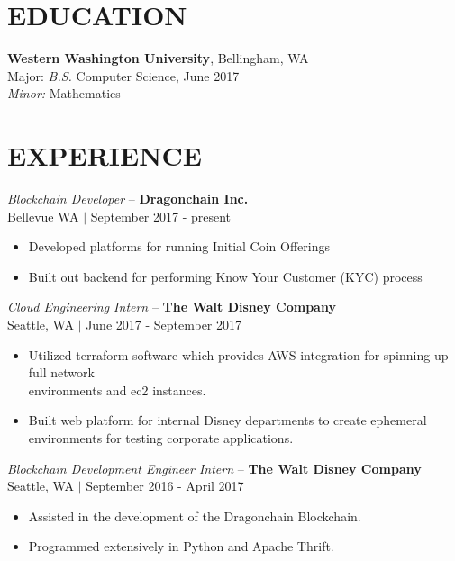 \documentclass[line,margin]{res}
\begin{document}
\address{alex@alex-benedetto.com $|$ github.com/wolfpack94}

\begin{resume}

\section{EDUCATION}
	{\bf Western Washington University}, Bellingham, WA \\
	Major: {\sl B.S.} Computer Science, {\small June 2017}\\
	{\sl Minor:} Mathematics
\section{EXPERIENCE}
	{\sl Blockchain Developer} -- {\bf Dragonchain Inc.}\\
	\footnotesize Bellevue WA $|$ September 2017 - present\\
	\begin{itemize} \itemsep -2pt
		\item Developed platforms for running Initial Coin Offerings\\
		\item Built out backend for performing Know Your Customer (KYC) process\\
	\end{itemize}
	{\sl Cloud Engineering Intern} -- {\bf The Walt Disney Company}\\ 
	{\footnotesize Seattle, WA $|$ June 2017 - September 2017}\\
	\begin{itemize} \itemsep -2pt
		\item Utilized terraform software which provides AWS integration for spinning up full network \\environments and ec2 instances.
		\item Built web platform for internal Disney departments to create ephemeral environments for testing corporate applications.
	\end{itemize}
	{\sl Blockchain Development Engineer Intern} -- {\bf The Walt Disney Company}\\ 
	{\footnotesize Seattle, WA $|$ September 2016 - April 2017}\\
	\begin{itemize} \itemsep -2pt
		\item Assisted in the development of the Dragonchain Blockchain.
		\item Programmed extensively in Python and Apache Thrift.

\end{itemize}
\end{resume}
\end{document}
